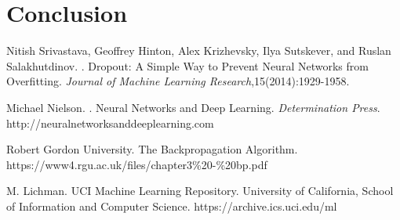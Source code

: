 \documentclass[11pt,letterpaper]{article}
\begin{document}
\section{Conclusion}


\begin{thebibliography}{}

Nitish Srivastava, Geoffrey Hinton, Alex Krizhevsky, Ilya Sutskever, and Ruslan Salakhutdinov.
.
\newblock Dropout: A Simple Way to Prevent Neural Networks from Overfitting. {\em Journal of Machine Learning Research},15(2014):1929-1958.

Michael Nielson.
.
\newblock Neural Networks and Deep Learning. {\em Determination Press}.
\newblock http://neuralnetworksanddeeplearning.com

Robert Gordon University.
\newblock The Backpropagation Algorithm.
\newblock https://www4.rgu.ac.uk/files/chapter3\%20-\%20bp.pdf

M. Lichman.
\newblock UCI Machine Learning Repository.
\newblock University of California, School of Information and Computer Science.
\newblock https://archive.ics.uci.edu/ml
\end{thebibliography}
\end{document}

